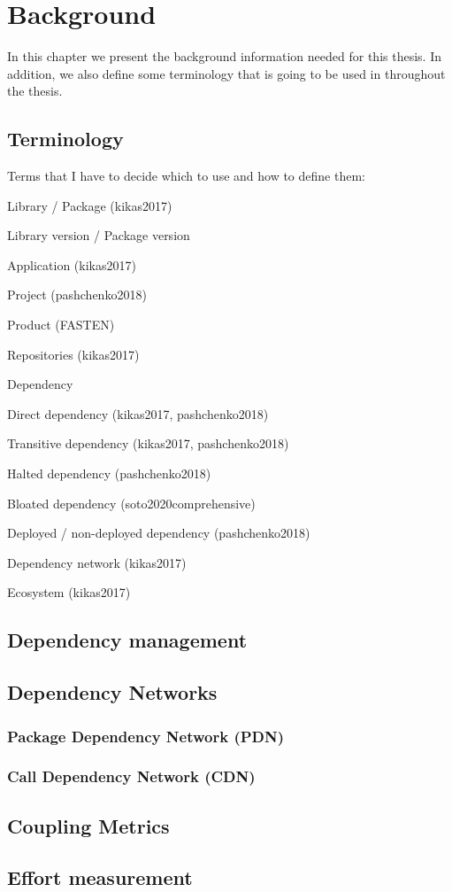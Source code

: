 \chapter{Background}\label{ch:Background}
In this chapter we present the background information needed for this thesis. In addition, we also define some terminology that is going to be used in throughout the thesis.

\section{Terminology}

Terms that I have to decide which to use and how to define them:

Library / Package (kikas2017)

Library version / Package version

Application (kikas2017)

Project (pashchenko2018)

Product (FASTEN)

Repositories (kikas2017)

Dependency

Direct dependency (kikas2017, pashchenko2018)

Transitive dependency (kikas2017, pashchenko2018)

Halted dependency (pashchenko2018)

Bloated dependency (soto2020comprehensive)

Deployed / non-deployed dependency (pashchenko2018)

Dependency network (kikas2017)

Ecosystem (kikas2017)

\reminder{}

\section{Dependency management}

\section{Dependency Networks}
\subsection{Package Dependency Network (PDN)}
\subsection{Call Dependency Network (CDN)}

\section{Coupling Metrics}

\section{Effort measurement}
